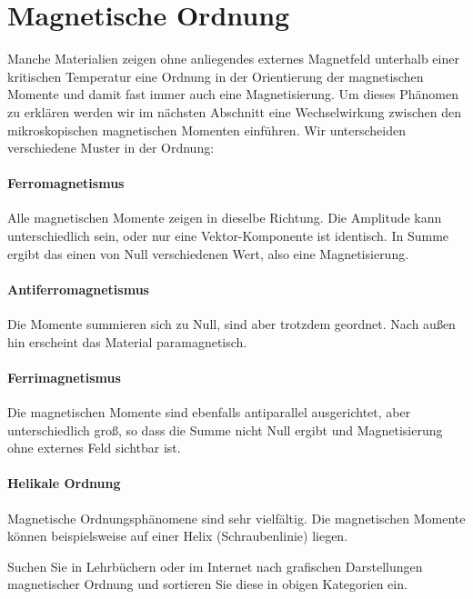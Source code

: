 \section{Magnetische Ordnung}

Manche Materialien zeigen ohne anliegendes externes Magnetfeld unterhalb einer kritischen Temperatur eine Ordnung in der Orientierung der magnetischen Momente und damit fast immer auch eine Magnetisierung. Um dieses Phänomen zu erklären werden wir im nächsten Abschnitt eine Wechselwirkung zwischen den mikroskopischen magnetischen Momenten einführen. Wir unterscheiden verschiedene Muster in der Ordnung:

\paragraph*{Ferromagnetismus} Alle magnetischen Momente zeigen in dieselbe Richtung. Die Amplitude kann unterschiedlich sein,  oder nur eine Vektor-Komponente ist identisch. In Summe ergibt das einen von Null verschiedenen Wert, also eine Magnetisierung.

\paragraph*{Antiferromagnetismus} Die Momente summieren sich zu Null, sind aber trotzdem geordnet. Nach außen hin erscheint das Material paramagnetisch.

\paragraph*{Ferrimagnetismus} Die magnetischen Momente sind ebenfalls antiparallel ausgerichtet, aber unterschiedlich groß, so dass die Summe nicht Null ergibt und Magnetisierung ohne externes Feld sichtbar ist.

\paragraph*{Helikale Ordnung} Magnetische Ordnungsphänomene sind sehr vielfältig. Die magnetischen Momente können beispielsweise auf einer Helix (Schraubenlinie) liegen.

\begin{questions}
    \item Suchen Sie in Lehrbüchern oder im Internet nach grafischen Darstellungen magnetischer Ordnung und sortieren Sie diese in obigen Kategorien  ein.
\end{questions}

